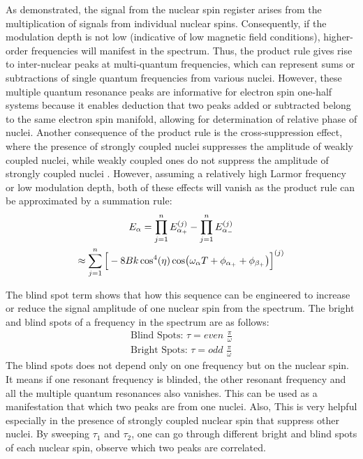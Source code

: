 \documentclass[%
 reprint,
superscriptaddress,
 amsmath,amssymb,
 aps,
]{revtex4-2}
\begin{document}
As demonstrated, the signal from the nuclear spin register arises from the multiplication of signals from individual nuclear spins.
Consequently, if the modulation depth is not low (indicative of low magnetic field conditions), higher-order frequencies will manifest in the spectrum.
Thus, the product rule gives rise to inter-nuclear peaks at multi-quantum frequencies, which can represent sums or subtractions of single quantum frequencies from various nuclei.
However, these multiple quantum resonance peaks are informative for electron spin one-half systems because it enables deduction that two peaks added or subtracted belong to the same electron spin manifold, allowing for determination of relative phase of nuclei.
Another consequence of the product rule is the cross-suppression effect, where the presence of strongly coupled nuclei suppresses the amplitude of weakly coupled nuclei, while weakly coupled ones do not suppress the amplitude of strongly coupled nuclei \cite{stoll2005peak}. However, assuming a relatively high Larmor frequency or low modulation depth, both of these effects will vanish as the product rule can be approximated by a summation rule:\\
\begin{gather}
	E_\alpha = \prod_{j=1}^n E_{\alpha_+}^{(j)} - \prod_{j=1}^n E_{\alpha_-}^{(j)}  \notag \\ 
	\approx \sum_{j=1}^n \Big[-8Bk\cos^4(\eta) \cos(\omega_\alpha T + \phi_{\alpha_+}+ \phi_{\beta_+}) \Big]^{(j)}
\end{gather}

The blind spot term shows that how this sequence can be engineered to increase or reduce the signal amplitude of one nuclear spin from the spectrum. The bright and blind spots of a frequency in the spectrum are as follows:
\begin{align}
	\text{Blind Spots:	} \tau = even \,\, \frac{\pi}{\omega}\\
	\text{Bright Spots:	} \tau = odd \,\, \frac{\pi}{\omega}
\end{align}
The blind spots does not depend only on one frequency but on the nuclear spin. It means if one resonant frequency is blinded, the other resonant frequency and all the multiple quantum resonances also vanishes. This can be used as a manifestation that which two peaks are from one nuclei. Also, This is very helpful especially in the presence of strongly coupled nuclear spin that suppress other nuclei. By sweeping $\tau_1$ and $\tau_2$, one can go through different bright and blind spots of each nuclear spin, observe which two peaks are correlated.
\end{document}
